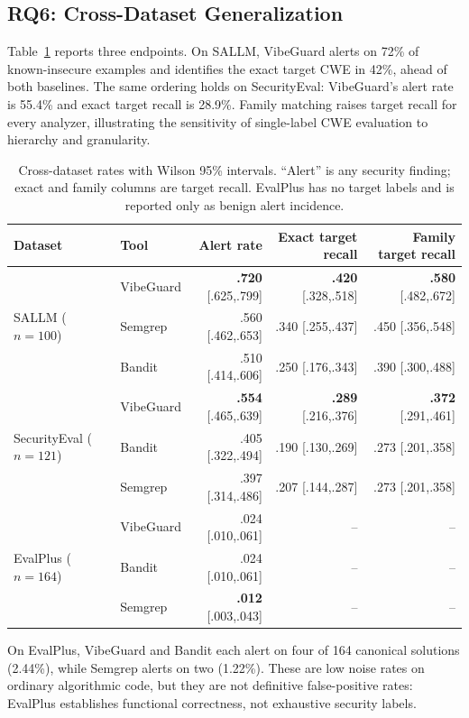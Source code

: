 \documentclass[sigconf,nonacm]{acmart}
\begin{document}
\subsection{RQ6: Cross-Dataset Generalization}

Table~\ref{tab:cross} reports three endpoints. On SALLM, VibeGuard alerts on
72\% of known-insecure examples and identifies the exact target CWE in 42\%,
ahead of both baselines. The same ordering holds on SecurityEval: VibeGuard's
alert rate is 55.4\% and exact target recall is 28.9\%. Family matching raises
target recall for every analyzer, illustrating the sensitivity of single-label
CWE evaluation to hierarchy and granularity.

\begin{table}[t]
\caption{Cross-dataset rates with Wilson 95\% intervals. ``Alert'' is any
security finding; exact and family columns are target recall. EvalPlus has no
target labels and is reported only as benign alert incidence.}
\label{tab:cross}
\centering
\small
\begin{tabular}{llrrr}
\toprule
Dataset & Tool & Alert rate & Exact target recall & Family target recall \\
\midrule
\multirow{3}{*}{SALLM ($n=100$)}
 & VibeGuard & \textbf{.720} [.625,.799] & \textbf{.420} [.328,.518] & \textbf{.580} [.482,.672] \\
 & Semgrep & .560 [.462,.653] & .340 [.255,.437] & .450 [.356,.548] \\
 & Bandit & .510 [.414,.606] & .250 [.176,.343] & .390 [.300,.488] \\
\midrule
\multirow{3}{*}{SecurityEval ($n=121$)}
 & VibeGuard & \textbf{.554} [.465,.639] & \textbf{.289} [.216,.376] & \textbf{.372} [.291,.461] \\
 & Bandit & .405 [.322,.494] & .190 [.130,.269] & .273 [.201,.358] \\
 & Semgrep & .397 [.314,.486] & .207 [.144,.287] & .273 [.201,.358] \\
\midrule
\multirow{3}{*}{EvalPlus ($n=164$)}
 & VibeGuard & .024 [.010,.061] & -- & -- \\
 & Bandit & .024 [.010,.061] & -- & -- \\
 & Semgrep & \textbf{.012} [.003,.043] & -- & -- \\
\bottomrule
\end{tabular}
\end{table}

On EvalPlus, VibeGuard and Bandit each alert on four of 164 canonical solutions
(2.44\%), while Semgrep alerts on two (1.22\%). These are low noise rates on
ordinary algorithmic code, but they are not definitive false-positive rates:
EvalPlus establishes functional correctness, not exhaustive security labels.
\end{document}

